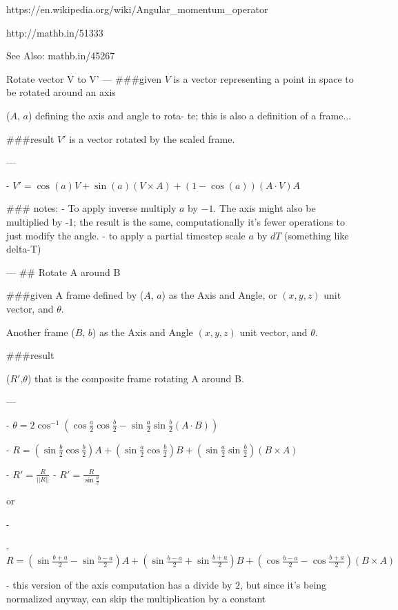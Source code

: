 https://en.wikipedia.org/wiki/Angular_momentum_operator


http://mathb.in/51333

See Also:  mathb.in/45267

Rotate vector V to V'
---
###given
 $V$ is a vector representing a point in space to be rotated around an axis

($A$, $a$) defining the axis and angle to rota- te; this is also a definition of a frame...

###result
 $V'$ is a vector rotated by the scaled frame.
 


---

- $ V' =  \cos(a) V + \sin( a )( V \times A) + (1-\cos( a )) ( A \cdot V ) A $



### notes:
 - To apply inverse multiply $a$ by $-1$.  The axis might also be multiplied by -1; the result is the same, computationally it's fewer operations to just modify the angle.
 - to apply a partial timestep scale $a$ by $dT$ (something like delta-T)


---
## Rotate A around B

###given
A frame defined by ($A$, $a$) as the Axis and Angle, or  $(x,y,z)$ unit vector, and $\theta$. 

Another frame ($B$, $b$) as the Axis and Angle  $(x,y,z)$ unit vector, and $\theta$.

###result 

($R'$,$\theta$) that is the composite frame rotating A around B.

---

- $  \theta = 2 \cos^{-1} ( \cos\frac a 2\cos\frac b 2-\sin\frac a 2\sin\frac b 2 ( A \cdot B ) )  $
  
- $   R = (\sin\frac b 2\cos\frac b 2)A 
           + (\sin\frac a 2\cos\frac b 2)B 
           + (\sin\frac a 2\sin\frac b 2)( B \times A )$

- $  R' = \frac R {||R||} $  
- $  R' = \frac R {\sin \frac \theta 2} $  

or

- 	


      
- $  R = (\sin \frac {b + a} 2 - \sin \frac {b - a} 2) A 
           + ( \sin\frac {b - a} 2 + \sin\frac {b + a} 2) B 
           + ( \cos\frac {b - a} 2 - \cos\frac {b + a} 2)( B \times A )$

  - this version of the axis computation has a divide by $2$, but since it's being  normalized anyway, can skip the multiplication by a constant

